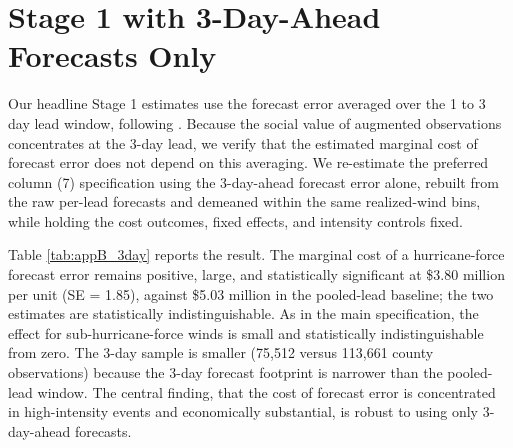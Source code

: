 %   

\section{Stage 1 with 3-Day-Ahead Forecasts Only} \label{app:3day}

Our headline Stage 1 estimates use the forecast error averaged over the 1 to 3 day lead window, following \citet{molina2024social}. Because the social value of augmented observations concentrates at the 3-day lead, we verify that the estimated marginal cost of forecast error does not depend on this averaging. We re-estimate the preferred column (7) specification using the 3-day-ahead forecast error alone, rebuilt from the raw per-lead forecasts and demeaned within the same realized-wind bins, while holding the cost outcomes, fixed effects, and intensity controls fixed.

Table \ref{tab:appB_3day} reports the result. The marginal cost of a hurricane-force forecast error remains positive, large, and statistically significant at \$3.80 million per unit (SE = 1.85), against \$5.03 million in the pooled-lead baseline; the two estimates are statistically indistinguishable. As in the main specification, the effect for sub-hurricane-force winds is small and statistically indistinguishable from zero. The 3-day sample is smaller (75,512 versus 113,661 county observations) because the 3-day forecast footprint is narrower than the pooled-lead window. The central finding, that the cost of forecast error is concentrated in high-intensity events and economically substantial, is robust to using only 3-day-ahead forecasts.


